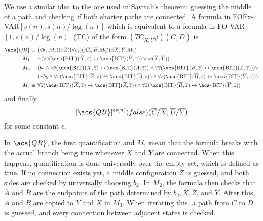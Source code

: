 We use a similar idea to the one used in Savitch's theorem: guessing the middle of a path and checking if both shorter paths are connected.
A formula in \acs{FOEx-VAR}$[s(n), s(n)/\log(n)]$ which is equivalent to a formula in \acs{FO-VAR}$[1, s(n)/\log(n)]$(\acs{TC}) of the form $\left( TC_{\overline{X}, \overline{Y}}\varphi \right)(\overline{C}, \overline{D})$ is
\[
    \begin{aligned}
        \acs{QB} \equiv~& (\forall b_{1}.M_{1})(\exists\overline{Z}) (\forall b_{2})(\exists \overline{A}, \overline{B}.M_{2})(\exists\overline{X}, \overline{Y}.M_{3}) \\
        M_{1} \equiv~& \neg(\forall \overline{z} (\text{\acs{BIT}}(\overline{X}, \overline{z}) \leftrightarrow \text{\acs{BIT}}(\overline{Y}, \overline{z})) \lor \varphi(\overline{X}, \overline{Y})) \\
        M_{2} \equiv~&(b_{2} \land \forall \overline{z} (\text{\acs{BIT}}(\overline{X}, \overline{z}) \leftrightarrow \text{\acs{BIT}}(\overline{A}, \overline{z}))\land \forall \overline{z} (\text{\acs{BIT}}(\overline{B}, \overline{z}) \leftrightarrow \text{\acs{BIT}}(\overline{Z}, \overline{z}))) \lor \\
        &(\neg b_{2} \land \forall \overline{z} (\text{\acs{BIT}}(\overline{Z}, \overline{z}) \leftrightarrow \text{\acs{BIT}}(\overline{A}, \overline{z}))\land \forall \overline{z} (\text{\acs{BIT}}(\overline{B}, \overline{z}) \leftrightarrow \text{\acs{BIT}}(\overline{Y}, \overline{z}))) \\
        M_{3} \equiv~&\forall \overline{z} (\text{\acs{BIT}}(\overline{X}, \overline{z}) \leftrightarrow \text{\acs{BIT}}(\overline{A}, \overline{z}))\land \forall \overline{z} (\text{\acs{BIT}}(\overline{B}, \overline{z}) \leftrightarrow \text{\acs{BIT}}(\overline{Y}, \overline{z}))
    \end{aligned}
\]
and finally
\[
    [\acs{QB}]^{cs(n)}(false)(\overline{C} / \overline{X}, \overline{D} / \overline{Y})
\]
for some constant $c$.

In $\acs{QB}$, the first quantification and $M_1$ mean that the formula breaks with the actual branch being true whenever $X$ and $Y$ are connected.
When this happens, quantification is done universally over the empty set, which is defined as true.
If no connection exists yet, a middle configuration $\overline{Z}$ is guessed, and both sides are checked by universally choosing $b_2$.
In $M_2$, the formula then checks that $\overline{A}$ and $\overline{B}$ are the endpoints of the path determined by $b_2, \overline{X}, \overline{Z} \text{, and }\overline{Y}$.
After this, $\overline{A}$ and $\overline{B}$ are copied to $\overline{Y}$ and $\overline{X}$ in $M_3$.
When iterating this, a path from $\overline{C}$ to $\overline{D}$ is guessed, and every connection between adjacent states is checked.

